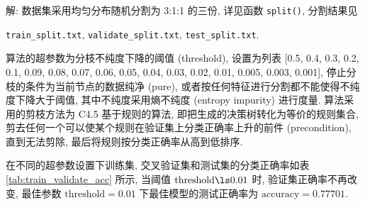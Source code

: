\documentclass[openany]{ctexbook}
\theoremstyle{kaiti}
\theoremstyle{normal}
\begin{document}
解: 数据集采用均匀分布随机分割为 3:1:1 的三份, 详见函数 \verb|split()|, 分割结果见 

\hspace{4cm}\verb|train_split.txt|, \verb|validate_split.txt|, \verb|test_split.txt|.

算法的超参数为分枝不纯度下降的阈值 (threshold), 设置为列表 [0.5, 0.4, 0.3, 0.2, 0.1, 0.09, 0.08, 0.07, 0.06, 0.05, 0.04, 0.03, 0.02, 0.01, 0.005, 0.003, 0.001], 停止分枝的条件为当前节点的数据纯净 (pure), 或者按任何特征进行分割都不能使得不纯度下降大于阈值, 其中不纯度采用熵不纯度 (entropy impurity) 进行度量. 算法采用的剪枝方法为 C4.5 基于规则的算法, 即把生成的决策树转化为等价的规则集合, 剪去任何一个可以使某个规则在验证集上分类正确率上升的前件 (precondition), 直到无法剪除, 最后将规则按分类正确率从高到低排序.

在不同的超参数设置下训练集, 交叉验证集和测试集的分类正确率如表 \ref{tab:train_validate_acc} 所示, 当阈值 $\text{threshold}\ls0.01$ 时, 验证集正确率不再改变, 最佳参数 $\text{threshold}=0.01$ 下最佳模型的测试正确率为 $\text{accuracy}=0.77701$.
\end{document}
